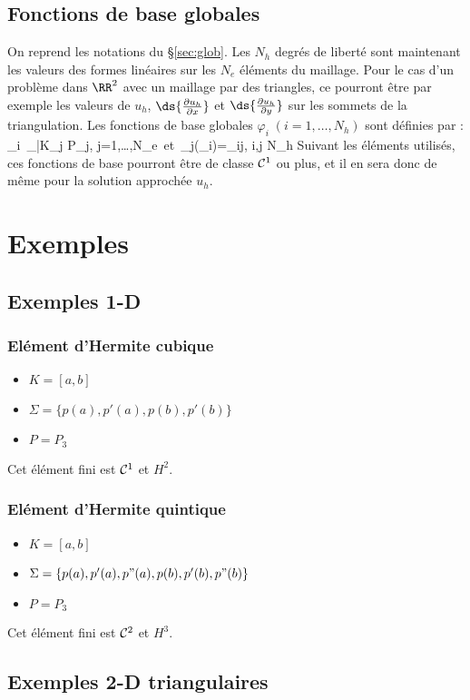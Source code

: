 \subsection{Fonctions de base globales}
%
\noindent
%
On reprend les notations du \S \ref{sec:glob}.
Les $N_h$ degr\'es de libert\'e sont maintenant les valeurs des formes lin\'eaires sur les $N_e$ \'el\'ements du maillage. Pour le cas d'un probl\`eme dans $\RR^2$ avec un maillage par des triangles, ce pourront \^etre par exemple les valeurs de $u_h$, $\ds{\frac{\partial u_h}{\partial x}}$ et $\ds{\frac{\partial u_h}{\partial y}}$ sur les sommets de la triangulation.\saut
%
Les fonctions de base globales $\varphi_i \; (i=1,\ldots,N_h)$ sont d\'efinies par :
\be
\varphi_i \,_{|K_j} \in P_j, \quad j=1,\ldots,N_e\qquad \hbox{ et }\qquad \sigma_j(\varphi_i)=\delta_{ij}, \le i,j \le N_h
\ee
%
%
Suivant les \'el\'ements utilis\'es, ces fonctions de base pourront \^etre de classe ${\cal C}^1$ ou plus, et il en sera donc de m\^eme pour la solution approch\'ee $u_h$.
%
%
\section{Exemples}
%
%
%
\subsection{Exemples 1-D}
%
\subsubsection{El\'ement d'Hermite cubique}
\begin{itemize}
\item $K=[a,b]$
\item $\Sigma=\{p(a),p'(a),p(b),p'(b)\}$
\item $P=P_3$
\end{itemize}
%
Cet \'el\'ement fini est ${\cal C}^1$ et $H^2$.
%
\subsubsection{El\'ement d'Hermite quintique}
\begin{itemize}
\item $K=[a,b]$
\item $\Sigma=\{p(a),p'(a),p"(a),p(b),p'(b),p"(b)\}$
\item $P=P_3$
\end{itemize}
%
Cet \'el\'ement fini est ${\cal C}^2$ et $H^3$.
%
%
\subsection{Exemples 2-D triangulaires}
%
